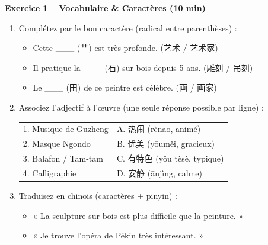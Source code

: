 \documentclass[11pt]{article}
\begin{document}
\begin{exercice}
\textbf{Exercice 1 -- Vocabulaire \& Caractères (10 min)}
\begin{enumerate}
    \item Complétez par le bon caractère (radical entre parenthèses) :
    \begin{itemize}
        \item Cette \_\_\_ (艹) est très profonde. (艺术 / 艺术家)
        \item Il pratique la \_\_\_ (石) sur bois depuis 5 ans. (雕刻 / 吊刻)
        \item Le \_\_\_ (田) de ce peintre est célèbre. (画 / 画家)
    \end{itemize}
    \item Associez l'adjectif à l'œuvre (une seule réponse possible par ligne) :
    \begin{center}
    \begin{tabular}{ll}
    1. Musique de Guzheng & A. 热闹 (rènao, animé) \\
    2. Masque Ngondo & B. 优美 (yōuměi, gracieux) \\
    3. Balafon / Tam-tam & C. 有特色 (yǒu tèsè, typique) \\
    4. Calligraphie & D. 安静 (ānjìng, calme) \\
    \end{tabular}
    \end{center}
    \item Traduisez en chinois (caractères + pinyin) :
    \begin{itemize}
        \item « La sculpture sur bois est plus difficile que la peinture. »
        \item « Je trouve l'opéra de Pékin très intéressant. »
    \end{itemize}
\end{enumerate}


\end{exercice}
\end{document}
